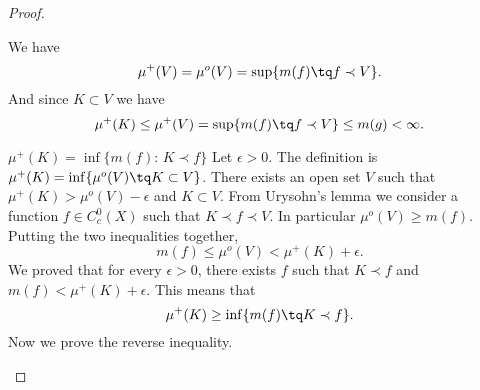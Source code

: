 \begin{proof}
\begin{subproof}
        We have
        \begin{equation}
            \mu^+(V)=\mu^o(V)=\sup\{ m(f)\tq f\prec V \}.
        \end{equation}
        And since \( K\subset V\) we have
        \begin{equation}
            \mu^+(K)\leq \mu^+(V)=\sup\{ m(f)\tq f\prec V \}\leq m(g)<\infty.
        \end{equation}
    \item[\( \mu^+(K)=\inf\{ m(f):\, K\prec f \}\)]
        Let \( \epsilon>0\). The definition is \( \mu^+(K)=\inf\{ \mu^o(V)\tq K\subset V \}\). There exists an open set \( V\) such that \( \mu^+(K)>\mu^o(V)-\epsilon\) and \( K\subset V\). From Urysohn's lemma we consider a function \( f\in C^0_c(X)\) such that \( K\prec f\prec V\). In particular \( \mu^o(V)\geq m(f)\). Putting the two inequalities together,
        \begin{equation}
            m(f)\leq \mu^o(V)<\mu^+(K)+\epsilon.
        \end{equation}
        We proved that for every \( \epsilon>0\), there exists \( f\) such that \( K\prec f\) and \( m(f)<\mu^+(K)+\epsilon\). This means that
        \begin{equation}
            \mu^+(K)\geq\inf\{ m(f)\tq K\prec f \}.
        \end{equation}
        Now we prove the reverse inequality.


\end{subproof}
\end{proof}
